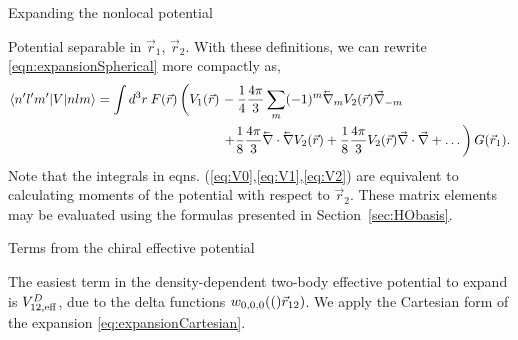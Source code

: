 \begin{section}{Expanding the nonlocal potential}
\begin{subsection}{Potential separable in $\vec{r}_1$, $\vec{r}_2$.\label{subsec:form1}}
With these definitions, we can rewrite \eqref{eqn:expansionSpherical} more compactly as,
\begin{equation}\label{eqn:expansion2}
\begin{split}
\braket{n' l' m'| V | n l m} =  \int d^3r\: F(\vec{r})\left( \vphantom{\frac{1}{2}}V_1(\vec{r})\right.&-\frac{1}{4}\frac{4\pi}{3}\sum_m(-1)^m \lvec{\nabla}_{m}  V_2(\vec{r}) \vec{\nabla}_{-m} \\
&\left.+\frac{1}{8}\frac{4\pi}{3}\lvec{\nabla}\cdot\lvec{\nabla} V_2(\vec{r})+\frac{1}{8}\frac{4\pi}{3}V_2(\vec{r})\vec{\nabla}\cdot\vec{\nabla}+\dots\right) G(\vec{r}_1).
\end{split}
\end{equation}
Note that the integrals in eqns. (\ref{eq:V0},\ref{eq:V1},\ref{eq:V2})  are equivalent to calculating moments of the potential with respect to $\vec{r}_2$. These matrix elements may be evaluated using the formulas presented in Section~\ref{sec:HObasis}.

\end{subsection}

\begin{subsection}{Terms from the chiral effective potential}

The easiest term in the density-dependent two-body effective potential to expand is $V_{12,\text{eff}}^D$, due to the delta functions $w_{0,0,0}(()\vec{r}_{12})$. We apply the Cartesian form of the expansion \eqref{eq:expansionCartesian}.


\end{subsection}
\end{section}
